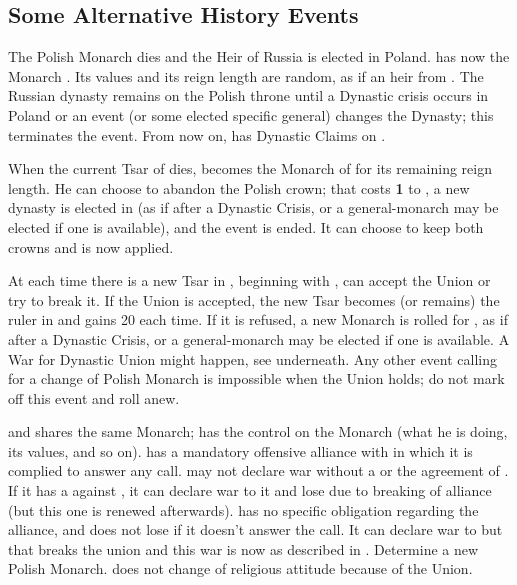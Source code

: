 \subsection{Some Alternative History Events}





\phevnt
\aparag The Polish Monarch dies and the Heir of Russia is elected in
Poland. \POL has now the Monarch .  Its values and its reign
length are random, as if an heir from \RUS.
\aparag The Russian dynasty remains on the Polish throne until a Dynastic
crisis occurs in Poland or an event (or some elected specific general) changes
the Dynasty; this terminates the event. From now on, \RUS has Dynastic Claims
on \POL.

\activation{}
\aparag When the current Tsar of \RUS dies,  becomes the
Monarch of \RUS for its remaining reign length.
\aparag He can choose to abandon the Polish crown; that costs {\bf 1} \STAB to
\RUS, a new dynasty is elected in \POL (as if after a Dynastic Crisis, or a
general-monarch may be elected if one is available), and the event is ended.
\aparag It can choose to keep both crowns and  is now applied.

\effetlong
\aparag At each time there is a new Tsar in \RUS, beginning with
, \POL can accept the Union or try to break it.
\bparag If the Union is accepted, the new Tsar becomes (or remains) the ruler
in \POL and \RUS gains 20 \PV each time.
\bparag If it is refused, a new Monarch is rolled for \POL, as if after a
Dynastic Crisis, or a general-monarch may be elected if one is available.  A
War for Dynastic Union might happen, see underneath.
\bparag Any other event calling for a change of Polish Monarch is impossible
when the Union holds; do not mark off this event and roll anew.



\effetlong
\aparag \RUS and \POL shares the same Monarch; \RUS has the control on the
Monarch (what he is doing, its values, and so on).
\aparag \POL has a mandatory offensive alliance with \RUS in which it is
complied to answer any call.
\aparag \POL may not declare war without a \CB or the agreement of \RUS. If it
has a \CB against \RUS, it can declare war to it and lose \STAB due to
breaking of alliance (but this one is renewed afterwards).
\aparag \RUS has no specific obligation regarding the alliance, and does not
lose \STAB if it doesn't answer the call. It can declare war to \POL but that
breaks the union and this war is now as described in .  Determine a new Polish Monarch.
\aparag \POL does not change of religious attitude because of the Union.


